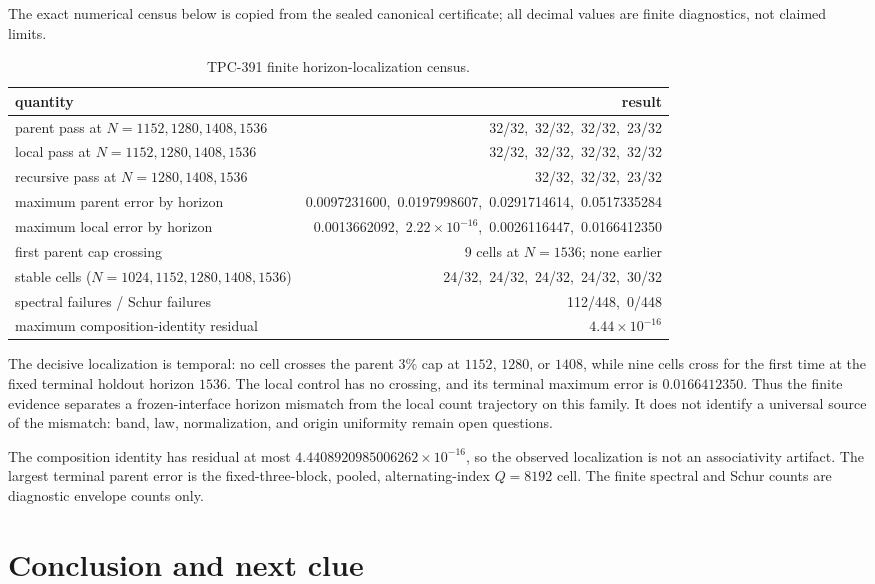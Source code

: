 \documentclass[10pt]{article}
\begin{document}
The exact numerical census below is copied from the sealed canonical
certificate; all decimal values are finite diagnostics, not claimed limits.

\begin{table}[t]
\centering
\caption{TPC-391 finite horizon-localization census.}
\small
\begin{tabular}{@{}l r@{}}
\toprule
quantity & result\\
\midrule
parent pass at $N=1152,1280,1408,1536$ &
32/32,\ 32/32,\ 32/32,\ 23/32\\
local pass at $N=1152,1280,1408,1536$ &
32/32,\ 32/32,\ 32/32,\ 32/32\\
recursive pass at $N=1280,1408,1536$ &
32/32,\ 32/32,\ 23/32\\
maximum parent error by horizon &
0.0097231600,\ 0.0197998607,\ 0.0291714614,\ 0.0517335284\\
maximum local error by horizon &
0.0013662092,\ $2.22\times10^{-16}$,\ 0.0026116447,\ 0.0166412350\\
first parent cap crossing & 9 cells at $N=1536$; none earlier\\
stable cells ($N=1024,1152,1280,1408,1536$) &
24/32,\ 24/32,\ 24/32,\ 24/32,\ 30/32\\
spectral failures / Schur failures & 112/448,\ 0/448\\
maximum composition-identity residual & $4.44\times10^{-16}$\\
\bottomrule
\end{tabular}
\end{table}

The decisive localization is temporal: no cell crosses the parent $3\%$ cap
at $1152$, $1280$, or $1408$, while nine cells cross for the first time at the
fixed terminal holdout horizon $1536$.  The local control has no crossing,
and its terminal maximum error is $0.0166412350$.  Thus the finite evidence
separates a frozen-interface horizon mismatch from the local count trajectory
on this family.  It does not identify a universal source of the mismatch:
band, law, normalization, and origin uniformity remain open questions.

The composition identity has residual at most
$4.4408920985006262\times10^{-16}$, so the observed localization is not an
associativity artifact.  The largest terminal parent error is the
fixed-three-block, pooled, alternating-index $Q=8192$ cell.  The finite
spectral and Schur counts are diagnostic envelope counts only.

\section{Conclusion and next clue}
\end{document}

